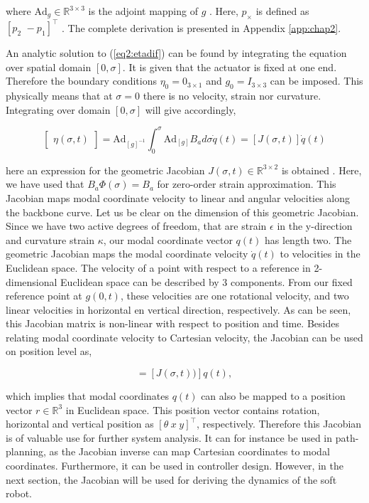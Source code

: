 where $\text{Ad}_g \in \mathbb{R}^{3 \times 3}$ \cite{2DLie} is the adjoint mapping of $g$ \cite{Sola2018}. Here, $p_\times$ is defined as $[p_2 \hspace{4pt} -p_1]^\top$ \cite{2DLie}. The complete derivation is presented in Appendix \ref{app:chap2}. 

An analytic solution to (\ref{eq2:etadif}) can be found by integrating the equation over spatial domain $[0,\sigma]$. It is given that the actuator is fixed at one end. Therefore the boundary conditions $\eta_0 = 0_{3 \times 1}$ and $g_0 = I_{3\times 3}$ can be imposed. This physically means that at $\sigma = 0$ there is no velocity, strain nor curvature. Integrating over domain $[0,\sigma]$ will give accordingly,

\begin{equation}
  \begin{bmatrix} \eta(\sigma,t)\end{bmatrix} = \text{Ad}_{[g]^{-1}} \int_0^{\sigma} \text{Ad}_{[g]} B_a d \sigma \dot{q}(t) = [J(\sigma,t)]\dot{q}(t)
    \label{eq2:J}
\end{equation}

here an expression for the geometric Jacobian $J(\sigma,t) \in \mathbb{R}^{3\times 2}$ is obtained \cite{Caasenbrood2020}. Here, we have used that $B_a \Phi(\sigma) = B_a$ for zero-order strain approximation. This Jacobian maps modal coordinate velocity to linear and angular velocities along the backbone curve. Let us be clear on the dimension of this geometric Jacobian. Since we have two active degrees of freedom, that are strain $\epsilon$ in the y-direction and curvature strain $\kappa$, our modal coordinate vector $q(t)$ has length two. The geometric Jacobian maps the modal coordinate velocity $\dot{q}(t)$ to velocities in the Euclidean space. The velocity of a point with respect to a reference in 2-dimensional Euclidean space can be described by 3 components. From our fixed reference point at $g(0,t)$, these velocities are one rotational velocity, and two linear velocities in horizontal en vertical direction, respectively. As can be seen, this Jacobian matrix is non-linear with respect to position and time. Besides relating modal coordinate velocity to Cartesian velocity, the Jacobian can be used on position level as,

\begin{equation}
    [r(\sigma,t)] = [J(\sigma,t))]q(t),
\end{equation}

which implies that modal coordinates $q(t)$ can also be mapped to a position vector $r\in \mathbb{R}^3$ in Euclidean space. This position vector contains rotation, horizontal and vertical position as $[\theta \hspace{3pt} x \hspace{3pt} y]^\top$, respectively. Therefore this Jacobian is of valuable use for further system analysis. It can for instance be used in path-planning, as the Jacobian inverse can map Cartesian coordinates to modal coordinates. Furthermore, it can be used in controller design. However, in the next section, the Jacobian will be used for deriving the dynamics of the soft robot. 


